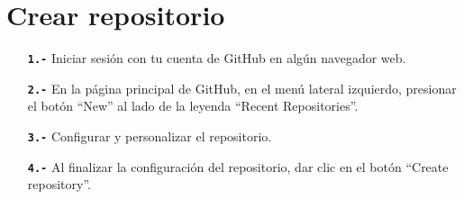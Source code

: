 \section{Crear repositorio}
	\begin{itemize}
		\item[\textbf{\texttt{1.-}}] Iniciar sesión con tu cuenta de GitHub en algún navegador web.
		\item[\textbf{\texttt{2.-}}] En la página principal de GitHub, en el menú lateral izquierdo, presionar el botón ``New'' al lado de la leyenda ``Recent Repositories''.
		\item[\textbf{\texttt{3.-}}] Configurar y personalizar el repositorio.
		\item[\textbf{\texttt{4.-}}] Al finalizar la configuración del repositorio, dar clic en el botón ``Create repository''.
	\end{itemize}
